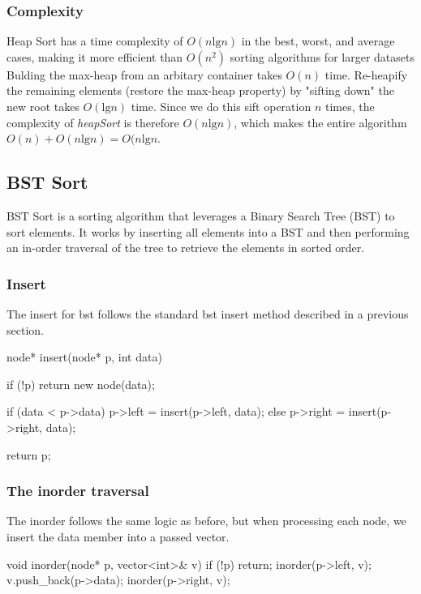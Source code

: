 \documentclass{report}
\begin{document}
\subsubsection{Complexity}
\bigbreak \noindent 
Heap Sort has a time complexity of $O(n\text{lg}n)$ in the best, worst, and average cases, making it more efficient than  $O(n^{2})$ sorting algorithms for larger datasets
\bigbreak \noindent 
Bulding the max-heap from an arbitary container takes $O(n)$ time. Re-heapify the remaining elements (restore the max-heap property) by "sifting down" the new root takes $O(\text{lg} n)$ time. Since we do this sift operation $n$ times, the  complexity of \textit{heapSort} is therefore $O(n\text{lg}n)$, which makes the entire algorithm $O(n) + O(n\text{lg}n) = O(n \text{lg}n$.

\pagebreak 
\subsection{BST Sort}
\bigbreak \noindent 
BST Sort is a sorting algorithm that leverages a Binary Search Tree (BST) to sort elements. It works by inserting all elements into a BST and then performing an in-order traversal of the tree to retrieve the elements in sorted order.
\bigbreak \noindent 
\subsubsection{Insert}
\bigbreak \noindent 
The insert for bst follows the standard bst insert method described in a previous section.
\bigbreak \noindent 
\begin{cppcode}
    node* insert(node* p, int data) {
        if (!p) return new node(data);

        if (data < p->data) {
            p->left = insert(p->left, data);
        } else {
            p->right = insert(p->right, data);
        }

        return p;
    }
\end{cppcode}

\bigbreak \noindent 
\subsubsection{The inorder traversal}
\bigbreak \noindent 
The inorder follows the same logic as before, but when processing each node, we insert the data member into a passed vector.
\bigbreak \noindent 
\begin{cppcode}
    void inorder(node* p, vector<int>& v) {
        if (!p) return;
        inorder(p->left, v);
        v.push_back(p->data);
        inorder(p->right, v);
    }
\end{cppcode}
\end{document}
